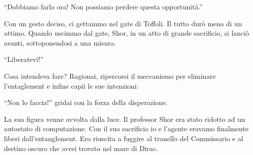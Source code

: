 \begin{center}
\begin{minipage}{0.7\textwidth}
    \centering
\end{minipage}
\end{center}

\begin{dialogue}
 \enquote{Dobbiamo farlo ora! Non possiamo perdere questa opportunità.}
\end{dialogue}
Con un gesto deciso, ci gettammo nel gate di Toffoli. Il tutto durò meno di un attimo. Quando uscimmo dal gate, Shor, in un atto di grande sacrificio, si lanciò avanti, sottoponendosi a una misura.

\begin{dialogue}
 \enquote{Liberatevi!}
\end{dialogue}
Cosa intendeva fare? Ragionai, ripercorsi il meccanismo per eliminare l'entaglement e infine capii le sue intenzioni:
\begin{dialogue}
 \enquote{Non lo faccia!} gridai con la forza della disperazione.
\end{dialogue}

La sua figura venne avvolta dalla luce. Il professor Shor era stato ridotto ad un autostato di computazione. Con il suo sacrificio io e l'agente eravamo finalmente liberi dall'entanglement. Ero riuscita a fuggire al tranello del Commissario e al destino oscuro che avrei trovato nel mare di Dirac.

